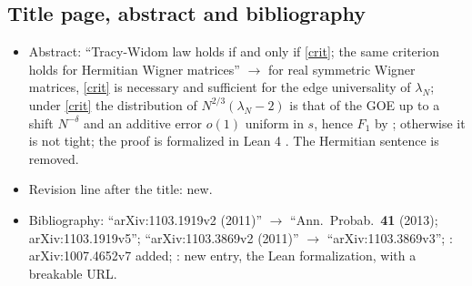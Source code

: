 \subsection*{Title page, abstract and bibliography}
\begin{itemize}
\item Abstract: ``Tracy-Widom law holds if and only if \eqref{crit}; the same criterion holds for Hermitian Wigner matrices'' $\to$ for real symmetric Wigner matrices, \eqref{crit} is necessary and sufficient for the edge universality of $\lambda_N$; under \eqref{crit} the distribution of $N^{2/3}(\lambda_N-2)$ is that of the GOE up to a shift $N^{-\delta}$ and an additive error $o(1)$ uniform in $s$, hence $F_1$ by \cite{TR1, TR2}; otherwise it is not tight; the proof is formalized in Lean 4 \cite{Lean}. The Hermitian sentence is removed.
\item Revision line after the title: new.
\item Bibliography: \cite{EKYY1} ``arXiv:1103.1919v2 (2011)'' $\to$ ``Ann.\ Probab.\ \textbf{41} (2013); arXiv:1103.1919v5''; \cite{EKYY2} ``arXiv:1103.3869v2 (2011)'' $\to$ ``arXiv:1103.3869v3''; \cite{EYY}: arXiv:1007.4652v7 added; \cite{Lean}: new entry, the Lean formalization, with a breakable URL.
\end{itemize}

